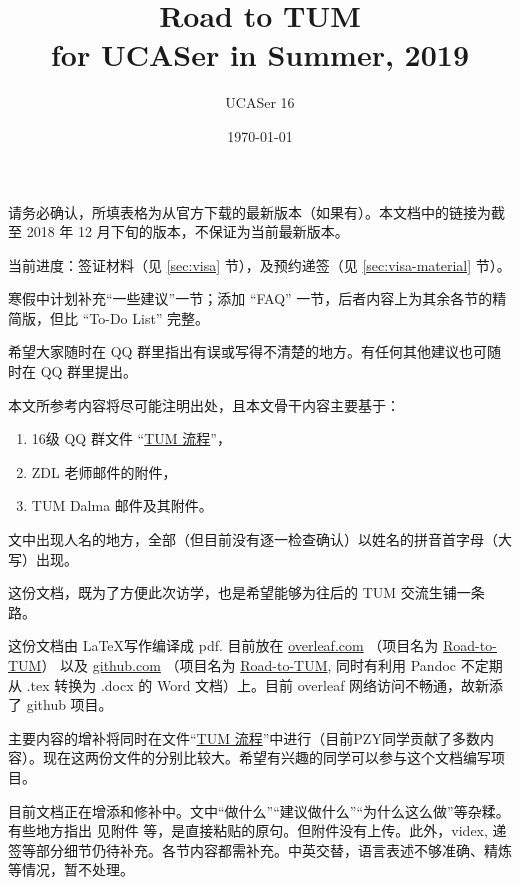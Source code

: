 \documentclass{article}
\title{Road to TUM\\for UCASer in Summer, 2019}
\author{UCASer 16}
\date{\today}
\begin{document}
\maketitle

请务必确认，所填表格为从官方下载的最新版本（如果有）。本文档中的链接为截至 2018 年 12 月下旬的版本，不保证为当前最新版本。

当前进度：签证材料（见 \ref{sec:visa} 节），及预约递签（见 \ref{sec:visa-material} 节）。

寒假中计划补充“一些建议”一节；添加 ``FAQ'' 一节，后者内容上为其余各节的精简版，但比 ``To-Do List'' 完整。

希望大家随时在 QQ 群里指出有误或写得不清楚的地方。有任何其他建议也可随时在 QQ 群里提出。

\vfill

本文所参考内容将尽可能注明出处，且本文骨干内容主要基于：
\begin{enumerate}          %
  \item 16级 QQ 群文件 “\href{https://docs.qq.com/doc/DSHd2dlFVZXpodEpq}{TUM 流程}”，
  \item ZDL 老师邮件的附件，
  \item TUM Dalma 邮件及其附件。
\end{enumerate}
文中出现人名的地方，全部（但目前没有逐一检查确认）以姓名的拼音首字母（大写）出现。

\vfill

这份文档，既为了方便此次访学，也是希望能够为往后的 TUM 交流生铺一条路。

这份文档由 \LaTeX 写作编译成 pdf. 目前放在 \href{https://www.overlear.com}{overleaf.com} （项目名为 \href{https://www.overleaf.com/2269426218fxwmgyxjywnn}{Road-to-TUM}） 以及 \href{https://github.com}{github.com} （项目名为 \href{https://github.com/Memcys/Road-to-TUM.git}{Road-to-TUM}, 同时有利用 Pandoc 不定期从 .tex 转换为 .docx 的 Word 文档）上。目前 overleaf 网络访问不畅通，故新添了 github 项目。

主要内容的增补将同时在文件“\href{https://docs.qq.com/doc/DSHd2dlFVZXpodEpq}{TUM 流程}”中进行（目前PZY同学贡献了多数内容）。现在这两份文件的分别比较大。希望有兴趣的同学可以参与这个文档编写项目。

目前文档正在增添和修补中。文中“做什么”“建议做什么”“为什么这么做”等杂糅。有些地方指出 见附件 等，是直接粘贴的原句。但附件没有上传。此外，videx, 递签等部分细节仍待补充。各节内容都需补充。中英交替，语言表述不够准确、精炼等情况，暂不处理。
\end{document}
